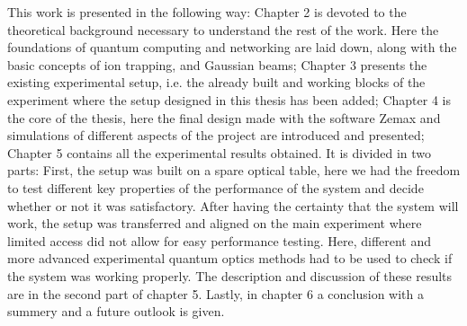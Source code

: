 \documentclass[english, a4paper, 12pt, twoside]{book}
\numberwithin{equation}{section} %
\begin{document}
This work is presented in the following way: Chapter 2 is devoted to the theoretical background necessary to understand the rest of the work. Here the foundations of quantum computing and networking are laid down, along with the basic concepts of ion trapping, and Gaussian beams; Chapter 3 presents the existing experimental setup, i.e. the already built and working blocks of the experiment where the setup designed in this thesis has been added; Chapter 4 is the core of the thesis, here the final design made with the software Zemax and simulations of different aspects of the project are introduced and presented;
Chapter 5 contains all the experimental results obtained. It is divided in two parts: First, the setup was built on a spare optical table, here we had the freedom to test different key properties of the performance of the system and decide whether or not it was satisfactory. After having the certainty that the system will work, the setup was transferred and aligned on the main experiment where limited access did not allow for easy performance testing. Here, different and more advanced experimental quantum optics methods had to be used to check if the system was working properly. The description and discussion of these results are in the second part of chapter 5. Lastly, in chapter 6 a conclusion with a summery and a future outlook is given.













\newpage




\newpage
\renewcommand{\appendixpagename}{Appendix} %
\renewcommand{\appendixtocname}{Appendix} %
\addappheadtotoc
\end{document}
